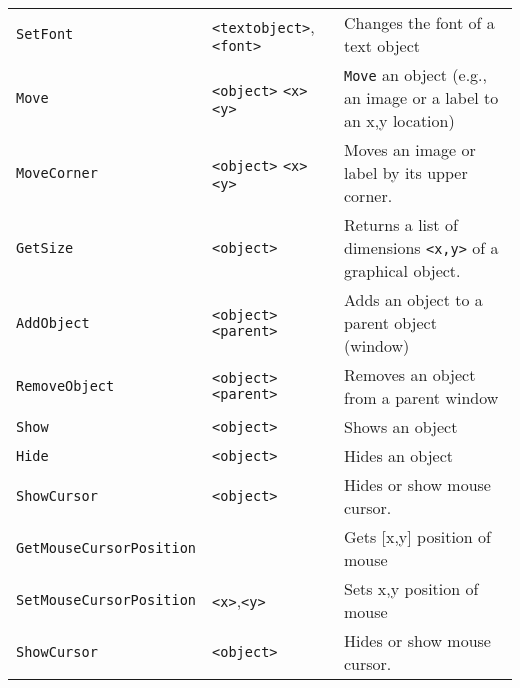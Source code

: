 \begin{longtable}{p{3cm}p{3cm}p{6cm}}
\verb+SetFont+ &\verb+<textobject>+, \verb+<font>+ &Changes the font of a text object \\ 
\verb+Move+ &\verb+<object>+ \verb+<x>+ \verb+<y>+& \verb+Move+ an object (e.g., an image or a label to an x,y location) \\ 
\verb+MoveCorner+ &\verb+<object>+ \verb+<x>+ \verb+<y>+& Moves an image or label by its upper corner.\\ 
\verb+GetSize+ &\verb+<object>+ &Returns a list of dimensions \verb+<x,y>+ of a graphical object.\\ 
\verb+AddObject+ &\verb+<object>+ \verb+<parent>+ & Adds an object to a parent object (window)\\ 
\verb+RemoveObject+ &\verb+<object>+ \verb+<parent>+ &Removes an object from a parent window\\ 
\verb+Show+ &\verb+<object>+ &Shows an object\\ 
\verb+Hide+ &\verb+<object>+ &Hides an object\\ 
\verb+ShowCursor+ &\verb+<object>+ &Hides or show mouse cursor.\\
\verb+GetMouseCursorPosition+ & &Gets [x,y] position of mouse\\
\verb+SetMouseCursorPosition+ &\verb+<x>+,\verb+<y>+ &Sets x,y position of mouse\\
\verb+ShowCursor+ &\verb+<object>+ &Hides or show mouse cursor.\\


\end{longtable}
